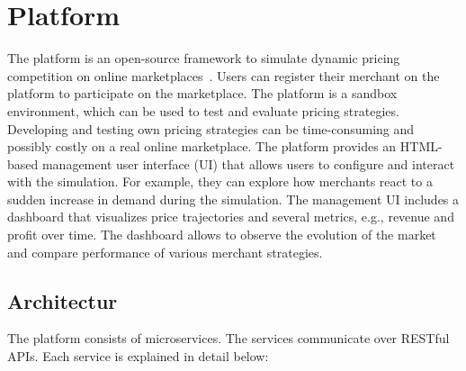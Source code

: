 
\chapter{\pricewars Platform}

The \pricewars platform is an open-source framework to simulate dynamic pricing competition on online marketplaces~\cite{DBLP:conf/recsys/0001SPSBLLSU17, edoc2017pricewars}.
Users can register their merchant on the platform to participate on the marketplace.
The platform is a sandbox environment, which can be used to test and evaluate pricing strategies. %
Developing and testing own pricing strategies can be time-consuming and possibly costly on a real online marketplace.
The platform provides an HTML-based management user interface (UI) that allows users to configure and interact with the simulation.
For example, they can explore how merchants react to a sudden increase in demand during the simulation.
The management UI includes a dashboard that visualizes price trajectories and several metrics, e.g., revenue and profit over time.
The dashboard allows to observe the evolution of the market and compare performance of various merchant strategies.

\section{Architectur}
The \pricewars platform consists of microservices.
The services communicate over RESTful APIs.
Each service is explained in detail below:


